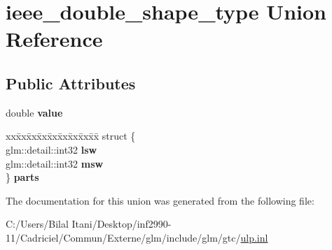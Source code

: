 \hypertarget{unionieee__double__shape__type}{}\section{ieee\+\_\+double\+\_\+shape\+\_\+type Union Reference}
\label{unionieee__double__shape__type}
\subsection*{Public Attributes}
\begin{DoxyCompactItemize}
\item 
double {\bfseries value}\hypertarget{unionieee__double__shape__type_a2d9c4cab9e3fa74e4be6d72f798a145b}{}\label{unionieee__double__shape__type_a2d9c4cab9e3fa74e4be6d72f798a145b}

\item 
\begin{tabbing}
xx\=xx\=xx\=xx\=xx\=xx\=xx\=xx\=xx\=\kill
struct \{\\
\>glm::detail::int32 {\bfseries lsw}\\
\>glm::detail::int32 {\bfseries msw}\\
\} {\bfseries parts}\hypertarget{unionieee__double__shape__type_a5b93add2b09b4a829f81fd66656e9601}{}\label{unionieee__double__shape__type_a5b93add2b09b4a829f81fd66656e9601}
\\

\end{tabbing}\end{DoxyCompactItemize}


The documentation for this union was generated from the following file\+:\begin{DoxyCompactItemize}
\item 
C\+:/\+Users/\+Bilal Itani/\+Desktop/inf2990-\/11/\+Cadriciel/\+Commun/\+Externe/glm/include/glm/gtc/\hyperlink{ulp_8inl}{ulp.\+inl}\end{DoxyCompactItemize}
